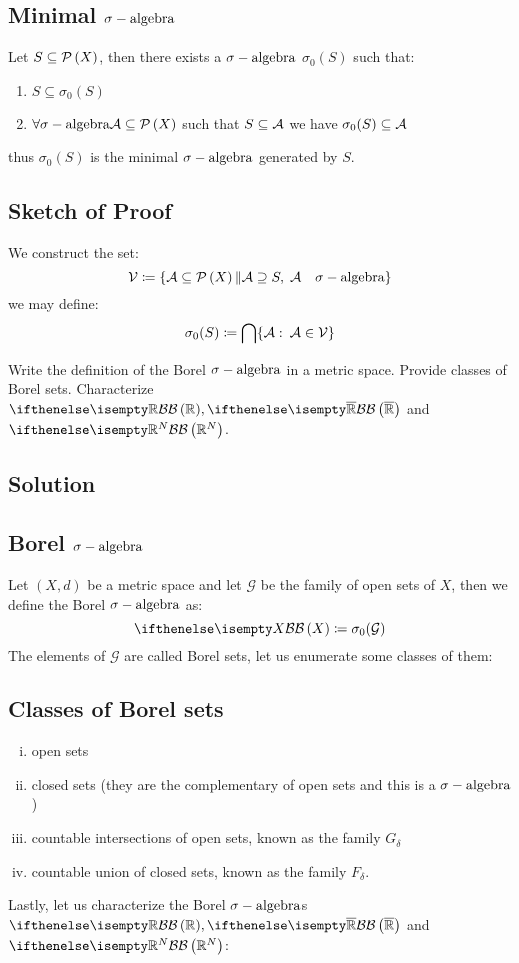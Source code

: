 \subsection{Minimal \texorpdfstring{$\sigma-\text{algebra}$}{TEXT}}
Let $S\subseteq\mathcal{P}\left(X\right)$, then there exists a $\sigma-\text{algebra}$ $\sigma_0(S)$ such that:\\
\begin{enumerate}
    \item $S\subseteq \sigma_0(S)$
    \item $\forall \sigma-\text{algebra} \mathcal{A}\subseteq\mathcal{P}\left(X\right)$ such that $S\subseteq\mathcal{A}$ we have $\sigma_0(S) \subseteq\mathcal{A}$
\end{enumerate}
thus $\sigma_0(S)$ is the minimal $\sigma-\text{algebra}$ generated by $S$.\\

\subsection*{Sketch of Proof}
We construct the set:
\[
    \mathcal{V} \coloneqq \{\mathcal{A} \subseteq \mathcal{P}\left(X\right) \| \mathcal{A} \supseteq S, \; \mathcal{A} \quad \sigma-\text{algebra} \}    
\]
we may define:
\[
    \sigma_0(S)\coloneqq \bigcap \{\mathcal{A}: \: \mathcal{A}\in\mathcal{V}\}    
\]

\question
Write the definition of the Borel $\sigma-\text{algebra}$ in a metric space. Provide classes of Borel sets.
Characterize $\B[\R], \B[\Rcomp]$ and $\B[\R^N]$.

\subsection*{Solution}

\subsection{Borel \texorpdfstring{$\sigma-\text{algebra}$}{TEXT}}
Let $(X,d)$ be a metric space and let $\mathcal{G}$ be the family of open sets of $X$, then we define the Borel $\sigma-\text{algebra}$ as:
\[
    \B[X] \coloneqq \sigma_0(\mathcal{G})    
\]
The elements of $\mathcal{G}$ are called Borel sets,   let us enumerate some classes of them:

\subsection{Classes of Borel sets} 
\begin{enumerate}[i)]
    \item open sets
    \item closed sets (they are the complementary of open sets and this is a $\sigma-\text{algebra}$)
    \item countable intersections of open sets, known as the family $G_\delta$
    \item countable union of closed sets, known as the family $F_\delta$.
\end{enumerate} 
Lastly, let us characterize the Borel $\sigma-\text{algebra}$s $\B[\R],\B[\Rcomp]$ and $\B[\R^N]$:
